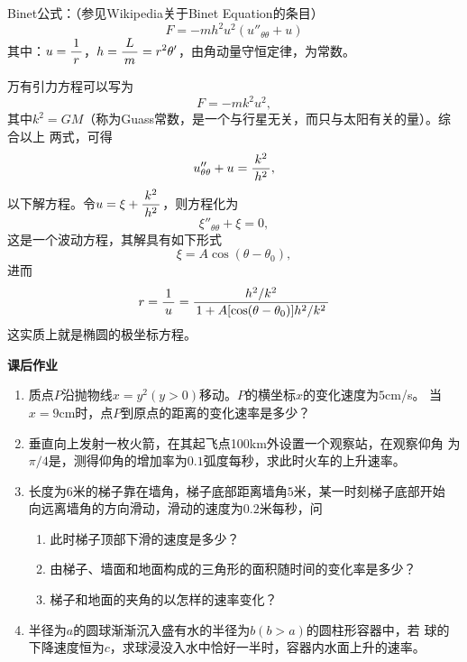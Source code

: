\begin{shaded}
	Binet公式：（参见Wikipedia关于Binet Equation的条目）
	$$F=-mh^2u^2\left(u''_{\theta\theta}+u\right)$$
	其中：$u=\displaystyle\frac{\,{1}\,}{\,{r}\,}$，$h=\displaystyle\frac{\,{L}\,}{\,{m}\,}=r^2\theta'$，由角动量守恒定律，为常数。
	
	万有引力方程可以写为
	$$F=-mk^2u^2,$$
	其中$k^2=GM$（称为{\kaishu Guass常数}，是一个与行星无关，而只与太阳有关的量）。综合以上
	两式，可得
	$$u''_{\theta\theta}+u=\displaystyle\frac{\,{k^2}\,}{\,{h^2}\,},$$
	以下解方程。令$u=\xi+\displaystyle\frac{\,{k^2}\,}{\,{h^2}\,}$，则方程化为
	$$\xi''_{\theta\theta}+\xi=0,$$
	这是一个波动方程，其解具有如下形式
	$$\xi=A\cos(\theta-\theta_0),$$
	进而
	$$r=\displaystyle\frac{\,{1}\,}{\,{u}\,}=\displaystyle\frac{\,{h^2/k^2}\,}{\,{1+A[\cos(\theta-\theta_0)]h^2/k^2}\,}$$
	这实质上就是椭圆的极坐标方程。
\end{shaded}

\begin{ext}
	{\centering\bf 课后作业}
	
	\begin{enumerate}  
	  \item 质点$P$沿抛物线$x=y^2(y>0)$移动。$P$的横坐标$x$的变化速度为$5$cm/s。
		当$x=9$cm时，点$P$到原点的距离的变化速率是多少？
	  \item 垂直向上发射一枚火箭，在其起飞点100km外设置一个观察站，在观察仰角
	  为$\pi/4$是，测得仰角的增加率为$0.1$弧度每秒，求此时火车的上升速率。
	  \item 长度为$6$米的梯子靠在墙角，梯子底部距离墙角$5$米，某一时刻梯子底部开始
	  向远离墙角的方向滑动，滑动的速度为$0.2$米每秒，问
	  \begin{enumerate}[(1)]
	    \item 此时梯子顶部下滑的速度是多少？
	    \item 由梯子、墙面和地面构成的三角形的面积随时间的变化率是多少？
	    \item 梯子和地面的夹角的以怎样的速率变化？
	  \end{enumerate}
	  \item 半径为$a$的圆球渐渐沉入盛有水的半径为$b(b>a)$的圆柱形容器中，若
	  球的下降速度恒为$c$，求球浸没入水中恰好一半时，容器内水面上升的速率。
	\end{enumerate}
\end{ext}

